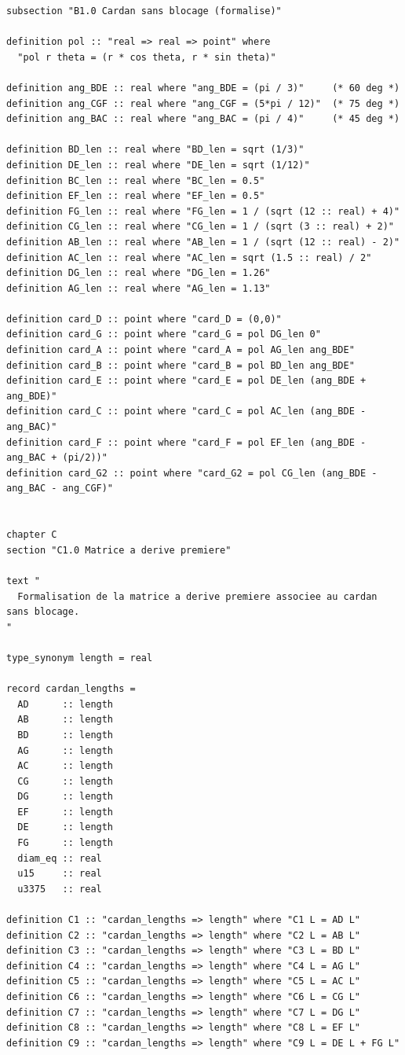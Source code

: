 \documentclass[12pt,a4paper]{article}
\theoremstyle{definition}
\theoremstyle{remark}
\begin{document}
\begin{verbatim}
subsection "B1.0 Cardan sans blocage (formalise)"

definition pol :: "real => real => point" where
  "pol r theta = (r * cos theta, r * sin theta)"

definition ang_BDE :: real where "ang_BDE = (pi / 3)"     (* 60 deg *)
definition ang_CGF :: real where "ang_CGF = (5*pi / 12)"  (* 75 deg *)
definition ang_BAC :: real where "ang_BAC = (pi / 4)"     (* 45 deg *)

definition BD_len :: real where "BD_len = sqrt (1/3)"
definition DE_len :: real where "DE_len = sqrt (1/12)"
definition BC_len :: real where "BC_len = 0.5"
definition EF_len :: real where "EF_len = 0.5"
definition FG_len :: real where "FG_len = 1 / (sqrt (12 :: real) + 4)"
definition CG_len :: real where "CG_len = 1 / (sqrt (3 :: real) + 2)"
definition AB_len :: real where "AB_len = 1 / (sqrt (12 :: real) - 2)"
definition AC_len :: real where "AC_len = sqrt (1.5 :: real) / 2"
definition DG_len :: real where "DG_len = 1.26"
definition AG_len :: real where "AG_len = 1.13"

definition card_D :: point where "card_D = (0,0)"
definition card_G :: point where "card_G = pol DG_len 0"
definition card_A :: point where "card_A = pol AG_len ang_BDE"
definition card_B :: point where "card_B = pol BD_len ang_BDE"
definition card_E :: point where "card_E = pol DE_len (ang_BDE + ang_BDE)"
definition card_C :: point where "card_C = pol AC_len (ang_BDE - ang_BAC)"
definition card_F :: point where "card_F = pol EF_len (ang_BDE - ang_BAC + (pi/2))"
definition card_G2 :: point where "card_G2 = pol CG_len (ang_BDE - ang_BAC - ang_CGF)"


chapter C
section "C1.0 Matrice a derive premiere"

text "
  Formalisation de la matrice a derive premiere associee au cardan sans blocage.
"

type_synonym length = real

record cardan_lengths =
  AD      :: length
  AB      :: length
  BD      :: length
  AG      :: length
  AC      :: length
  CG      :: length
  DG      :: length
  EF      :: length
  DE      :: length
  FG      :: length
  diam_eq :: real
  u15     :: real
  u3375   :: real

definition C1 :: "cardan_lengths => length" where "C1 L = AD L"
definition C2 :: "cardan_lengths => length" where "C2 L = AB L"
definition C3 :: "cardan_lengths => length" where "C3 L = BD L"
definition C4 :: "cardan_lengths => length" where "C4 L = AG L"
definition C5 :: "cardan_lengths => length" where "C5 L = AC L"
definition C6 :: "cardan_lengths => length" where "C6 L = CG L"
definition C7 :: "cardan_lengths => length" where "C7 L = DG L"
definition C8 :: "cardan_lengths => length" where "C8 L = EF L"
definition C9 :: "cardan_lengths => length" where "C9 L = DE L + FG L"


\end{verbatim}
\end{document}
